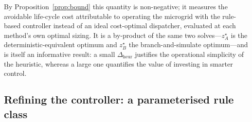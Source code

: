 \documentclass[11pt,a4paper]{article}
\theoremstyle{plain}
\theoremstyle{definition}
\begin{document}
By Proposition~\ref{prop:bound} this quantity is non-negative; it measures the avoidable
life-cycle cost attributable to operating the microgrid with the rule-based controller
instead of an ideal cost-optimal dispatcher, evaluated at each method's own optimal
sizing. It is a by-product of the same two solves---$z_A^\star$ is the
deterministic-equivalent optimum and $z_B^\star$ the branch-and-simulate optimum---and is
itself an informative result: a small $\Delta_{\mathrm{heur}}$ justifies the operational
simplicity of the heuristic, whereas a large one quantifies the value of investing in
smarter control.

\subsection{Refining the controller: a parameterised rule class}
\label{sec:refine}
\end{document}
